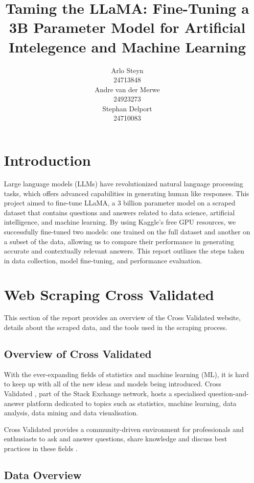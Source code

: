 \documentclass[10pt]{article}
\title{Taming the LLaMA: Fine-Tuning a 3B Parameter Model for Artificial Intelegence and Machine Learning}
\author{
        \begin{minipage}{0.3\textwidth}
            \centering
            Arlo Steyn\\
            24713848
        \end{minipage}%
    \hfill
        \begin{minipage}{0.3\textwidth}
            \centering
            Andre van der Merwe\\
            24923273
        \end{minipage}%
    \hfill
        \begin{minipage}{0.3\textwidth}
            \centering
            Stephan Delport\\
            24710083
        \end{minipage}%
}
\begin{document}
\maketitle

\section{Introduction}
Large language models (LLMs) have revolutionized natural language processing tasks,
which offers advanced capabilities in generating human like responses. This project
aimed to fine-tune LLaMA, a 3 billion parameter model on a scraped dataset that contains
questions and answers related to data science, artificial intelligence, and machine learning.
By using Kaggle's free GPU resources, we successfully fine-tuned two models: one trained on
the full dataset and another on a subset of the data, allowing us to compare their performance
in generating accurate and contextually relevant answers. This report outlines the steps taken
in data collection, model fine-tuning, and performance evaluation.

\section{Web Scraping Cross Validated}

This section of the report provides an overview of the Cross Validated website,
details about the scraped data, and the tools used in the scraping process.

\subsection{Overview of Cross Validated}

With the ever-expanding fields of statistics and machine learning (ML), it is hard to keep up with all of
the new ideas and models being introduced.
Cross Validated \cite{stackexchange}, part of the Stack Exchange network, hosts a specialised question-and-answer platform
dedicated to topics such as statistics, machine learning, data analysis, data mining and data visualisation.

Cross Validated provides a community-driven environment for professionals and enthusiasts to ask and answer
questions, share knowledge and discuss best practices in these fields \cite{stackexchange-tour}.

\subsection{Data Overview}
\end{document}
